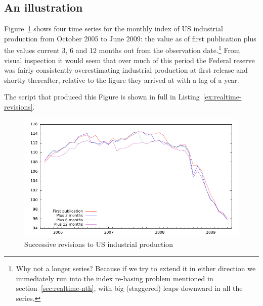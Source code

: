 \subsection{An illustration}

Figure~\ref{fig:realtime-lag} shows four time series for the monthly
index of US industrial production from October 2005 to June 2009: the
value as of first publication plus the values current 3, 6 and 12
months out from the observation date.\footnote{Why not a longer
  series? Because if we try to extend it in either direction we
  immediately run into the index re-basing problem mentioned in
  section~\ref{sec:realtime-nth}, with big (staggered) leaps downward
  in all the series.} From visual inspection it would seem that over
much of this period the Federal reserve was fairly consistently
overestimating industrial production at first release and shortly
thereafter, relative to the figure they arrived at with a lag of a
year.

The script that produced this Figure is shown in full in
Listing~\ref{ex:realtime-revisions}.

\begin{figure}[htbp]
  \centering
\includegraphics{figures/realtime}
  \caption{Successive revisions to US industrial production}
  \label{fig:realtime-lag}
\end{figure}

